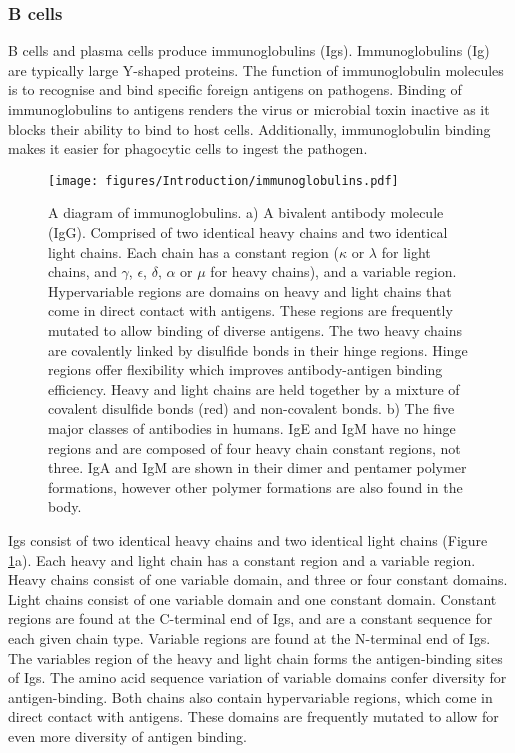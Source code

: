 \subsubsection{B cells}
B cells and plasma cells produce immunoglobulins (Igs).
Immunoglobulins (Ig) are typically large Y-shaped proteins.
The function of immunoglobulin molecules is to recognise and bind specific foreign antigens on pathogens.
Binding of immunoglobulins to antigens renders the virus or microbial toxin inactive as it blocks their ability to bind to host cells.
Additionally, immunoglobulin binding makes it easier for phagocytic cells to ingest the pathogen.
\begin{figure}[htb]
\centering\texttt{[image: figures/Introduction/immunoglobulins.pdf]}
\caption[Immunoglobulins diagram]{A diagram of immunoglobulins.
a) A bivalent antibody molecule (IgG).
Comprised of two identical heavy chains and two identical light chains.
Each chain has a constant region ($\kappa$ or $\lambda$ for light chains, and $\gamma$, $\epsilon$, $\delta$, $\alpha$ or $\mu$ for heavy chains), and a variable region.
Hypervariable regions are domains on heavy and light chains that come in direct contact with antigens.
These regions are frequently mutated to allow binding of diverse antigens.
The two heavy chains are covalently linked by disulfide bonds in their hinge regions.
Hinge regions offer flexibility which improves antibody-antigen binding efficiency.
Heavy and light chains are held together by a mixture of covalent disulfide bonds (red) and non-covalent bonds.
b) The five major classes of antibodies in humans.
IgE and IgM have no hinge regions and are composed of four heavy chain constant regions, not three.
IgA and IgM are shown in their dimer and pentamer polymer formations, however other polymer formations are also found in the body.}
\label{fig:immunoglobulins_diagram}\end{figure}

Igs consist  of two identical heavy chains and two identical light chains (Figure \ref{fig:immunoglobulins_diagram}a).
Each heavy and light chain has a constant region and a variable region.
Heavy chains consist of one variable domain, and three or four constant domains.
Light chains consist of one variable domain and one constant domain.
Constant regions are found at the C-terminal end of Igs, and are a constant sequence for each given chain type.
Variable regions are found at the N-terminal end of Igs.
The variables region of the heavy and light chain forms the antigen-binding sites of Igs.
The amino acid sequence variation of variable domains confer diversity for antigen-binding.
Both chains also contain hypervariable regions, which come in direct contact with antigens.
These domains are frequently mutated to allow for even more diversity of antigen binding.

